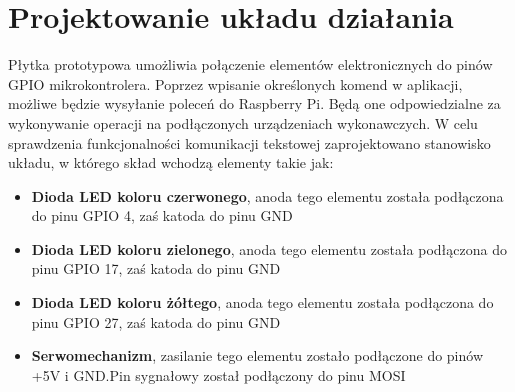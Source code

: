 \section{Projektowanie układu działania}
 Płytka prototypowa umożliwia połączenie elementów elektronicznych do pinów GPIO mikrokontrolera. Poprzez wpisanie określonych komend w aplikacji, możliwe będzie wysyłanie poleceń do Raspberry Pi. Będą one odpowiedzialne za wykonywanie operacji na podłączonych urządzeniach wykonawczych. W celu sprawdzenia funkcjonalności komunikacji tekstowej zaprojektowano stanowisko układu, w którego skład wchodzą elementy takie jak: 
\begin{itemize}  
	\item \textbf{Dioda LED koloru czerwonego}, anoda tego elementu została podłączona do pinu GPIO 4, zaś katoda do pinu GND
	\\
\item \textbf{Dioda LED koloru zielonego}, anoda tego elementu została podłączona do pinu GPIO 17, zaś katoda do pinu GND
	\\
\item \textbf{Dioda LED koloru żółtego}, anoda tego elementu została podłączona do pinu GPIO 27, zaś katoda do pinu GND
	\\
	\item \textbf{Serwomechanizm}, zasilanie tego elementu zostało podłączone do pinów +5V i GND.Pin sygnałowy został podłączony do pinu MOSI
	\\
\end{itemize}
